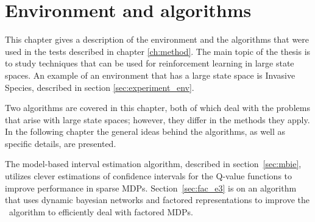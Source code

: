 \chapter{Environment and algorithms}
\label{ch:algo}

This chapter gives a description of the environment and  the algorithms that
were used in the tests described in chapter \ref{ch:method}. The main topic of
the thesis is to study techniques that can be used for reinforcement learning
in large state spaces. An example of an environment that has a large state
space is Invasive Species, described in section \ref{sec:experiment_env}. 

Two algorithms are covered in this chapter, both of which deal with the
problems that arise with large state spaces; however, they differ in the
methods they apply. In the following chapter the general ideas behind the
algorithms, as well as specific details, are presented. 

The model-based interval estimation algorithm, described in
section~\ref{sec:mbie}, utilizes clever estimations of confidence intervals for
the Q-value functions to improve performance in sparse MDPs.
Section~\ref{sec:fac_e3} is on an algorithm that uses dynamic bayesian networks
and factored representations to improve the \etre\ algorithm to efficiently
deal with factored MDPs. 




